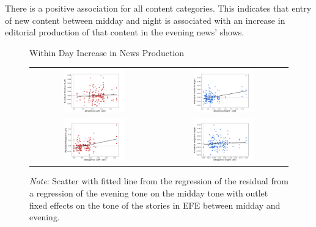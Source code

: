 \documentclass[12pt]{article}
\begin{document}
There is a positive association for all content categories. This indicates that entry of new content between midday and night is associated with an increase in editorial production of that content in the evening news' shows. 


\begin{figure}[h!]
		\caption{Within Day Increase in News Production}
	\centering
	\begin{tabular}{@{}cc@{}}
		\includegraphics[width=0.5\textwidth]{figures/char_pos_left_residual} &
		\includegraphics[width=0.5\textwidth]{figures/char_pos_right_residual} \\[-.2pt]
		\includegraphics[width=0.5\textwidth]{figures/char_neg_left_residual} &
		\includegraphics[width=0.5\textwidth]{figures/char_neg_right_residual}
	\end{tabular}
	\caption*{\textit{Note}: \small Scatter with fitted line from the regression of the residual from a regression of the evening tone on the midday tone with outlet fixed effects on the tone of the stories in EFE between midday and evening.}

	\label{fig:diff}
\end{figure}
\end{document}
